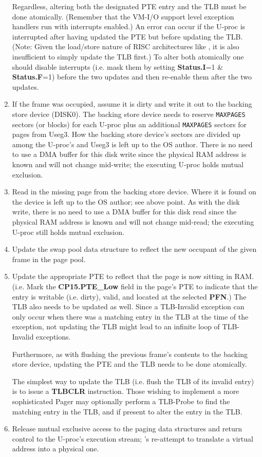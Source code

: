 \begin{enumerate}
Regardless, altering both the designated PTE entry and the TLB must be done atomically. 
(Remember that the VM-I/O support level exception handlers run with interrupts enabled.) An error can occur if the U-proc is interrupted after having updated the PTE but before updating the TLB. (Note: Given the load/store nature of RISC architectures like \uarm{}, it is also insufficient to simply update the TLB first.) 
To alter both atomically one should disable interrupts (i.e. mask them by setting \textbf{Status.I}=1 \& \textbf{Status.F}=1) before the two updates and then re-enable them after the two updates.
\item  If the frame was occupied, assume it is dirty and write it out to the backing store device (DISK0). 
The backing store device needs to reserve \verb+MAXPAGES+ sectors (or blocks) for each U-proc plus an additional \verb+MAXPAGES+ sectors for pages from Useg3. 
How the backing store device's sectors are divided up among the U-proc's and Useg3 is left up to the OS author. 
There is no need to use a DMA buffer for this disk write since the physical RAM address is known and will not change mid-write; the executing U-proc holds mutual exclusion.
\item Read in the missing page from the backing store device. 
Where it is found on the device is left up to the OS author; see above point. 
As with the disk write, there is no need to use a DMA buffer for this disk read since the physical RAM address is known and will not change mid-read; the executing U-proc still holds mutual exclusion.
\item Update the swap pool data structure to reflect the new occupant of the given frame in the page pool.
\item Update the appropriate PTE to reflect that the page is now sitting in RAM.
(i.e. Mark the \textbf{CP15.PTE\_Low} field in the page's PTE to indicate that the entry is writable (i.e. dirty), valid, and located at the selected \textbf{PFN}.) 
The TLB also needs to be updated as well. Since a TLB-Invalid exception can only occur when there was a matching entry in the TLB at the time of the exception, not updating the TLB might lead to an infinite loop of TLB-Invalid exceptions.

Furthermore, as with flushing the previous frame's contents to the backing store device, updating the PTE and the TLB needs to be done atomically.

The simplest way to update the TLB (i.e. flush the TLB of its invalid entry) is to issue a \textbf{TLBCLR} instruction. 
Those wishing to implement a more sophisticated Pager may optionally perform a TLB-Probe to find the matching entry in the TLB, and if present to alter the entry in the TLB.
\item Release mutual exclusive access to the paging data structures and return control to the U-proc's execution stream; \uarm{}'s re-attempt to translate a virtual address into a physical one.
\end{enumerate}


